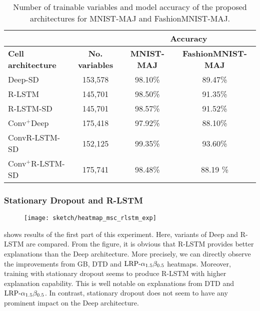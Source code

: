 \renewcommand{\arraystretch}{1.5}
\begin{table}[h]
\begin{center}
\begin{tabular}{lc|c|c|}
\cline{3-4}
& &
\multicolumn{2}{c|}{\parbox{3.5cm}{ \vskip 1mm \centering \textbf{Accuracy} \vskip 1mm}} \\ \hline
\multicolumn{1}{|l|}{\textbf{Cell architecture}} & \textbf{No. variables} & \textbf{MNIST-MAJ} & \textbf{FashionMNIST-MAJ} \\ \hline
\multicolumn{1}{|l|}{Deep-SD}                  & 153,578             & 98.10\% & 89.47\% \\ 
\multicolumn{1}{|l|}{R-LSTM}                    & 145,701   & 98.50\% & 91.35\% \\ 
\multicolumn{1}{|l|}{R-LSTM-SD}              &  145,701                & 98.57\% & 91.52\% \\ 
 \multicolumn{1}{|l|}{Conv$^+$Deep}       & 175,418                 & 97.92\% & 88.10\% \\
 \multicolumn{1}{|l|}{ConvR-LSTM-SD}      & 152,125                 & 99.35\% & 93.60\%  \\ 
\multicolumn{1}{|l|}{Conv$^+$R-LSTM-SD}   & 175,741                & 98.48\% & 88.19	\%  \\ \hline 
\end{tabular}

\end{center}
\caption{Number of trainable variables and model accuracy of the  proposed architectures for MNIST-MAJ and FashionMNIST-MAJ.}
\label{tab:maj_exp3_model_acc}
\end{table}
\renewcommand{\arraystretch}{1}


\subsubsection{Stationary Dropout and R-LSTM}
 \begin{figure}[!htb]
\centering
\texttt{[image: sketch/heatmap\_msc\_rlstm\_exp]}
\label{fig:heatmap_msc_rlstm_exp}
\end{figure}

\addfigure{\ref{fig:heatmap_msc_rlstm_exp}} shows results of the first part of this experiment. Here, variants of Deep and R-LSTM are compared. From the figure, it is obvious that R-LSTM provides better explanations than the Deep architecture. More precisely, we can directly observe the improvements from GB, DTD and $\text{LRP-}\alpha_{1.5}\beta_{0.5}$ heatmaps. Moreover, training with stationary dropout seems to produce R-LSTM with higher explanation capability. This is well notable on explanations from  DTD and $\text{LRP-}\alpha_{1.5}\beta_{0.5}$. In contrast, stationary dropout does not seem to have any prominent impact on the Deep architecture.


